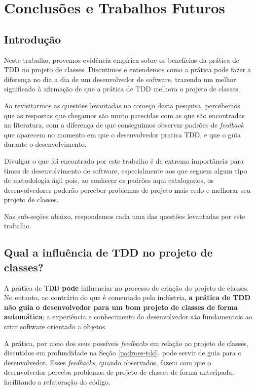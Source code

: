 \chapter{Conclusões e Trabalhos Futuros}
\label{cap:conclusoes}

\section{Introdução}

Neste trabalho, provemos evidência empírica sobre os benefícios da prática de TDD
no projeto de classes.
Discutimos e entendemos como a prática pode
fazer a diferença no dia a dia de um desenvolvedor de software,
trazendo um melhor significado à afirmação de que a prática de TDD melhora o projeto de classes.

Ao revisitarmos as questões levantadas no começo desta pesquisa,
percebemos que as respostas que chegamos são muito parecidas
com as que são encontradas na literatura, com a diferença de 
que conseguimos observar padrões de \textit{feedback} que aparecem
no momento em que o desenvolvedor pratica TDD, e que o guia durante
o desenvolvimento.

Divulgar o que foi encontrado por este trabalho é de extrema importância
para times de desenvolvimento de software, especialmente aos que seguem
algum tipo de metodologia ágil pois, ao conhecer os padrões aqui catalogados,
os desenvolvedores poderão perceber problemas de projeto mais cedo e
melhorar seu projeto de classes.

Nas sub-seções abaixo, respondemos cada uma das questões levantadas
por este trabalho.

\section{Qual a influência de TDD no projeto de classes?}

A prática de TDD \textbf{pode} influenciar no processo de criação do projeto de classes.
No entanto, ao contrário do que é comentado pela indústria,
\textbf{a prática de TDD não guia o desenvolvedor para um bom projeto de classes
de forma automática}; a experiência e conhecimento 
do desenvolvedor são fundamentais ao criar software orientado a objetos. 

A prática, por meio dos seus possíveis \textit{feedbacks} em relação ao
projeto de classes, discutidos
em profundidade na Seção \ref{padroes-tdd}, pode servir de guia
para o desenvolvedor. Esses \textit{feedbacks}, quando observados, fazem
com que o desenvolvedor perceba problemas de projeto de classes de
forma antecipada, facilitando a refatoração do código.

